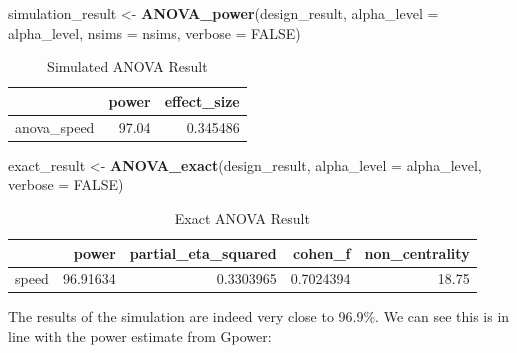 \documentclass[]{book}
\newenvironment{Shaded}{\begin{snugshade}}{\end{snugshade}}
\newcommand{\DataTypeTok}[1]{\textcolor[rgb]{0.13,0.29,0.53}{#1}}
\newcommand{\KeywordTok}[1]{\textcolor[rgb]{0.13,0.29,0.53}{\textbf{#1}}}
\newcommand{\NormalTok}[1]{#1}
\newcommand{\OtherTok}[1]{\textcolor[rgb]{0.56,0.35,0.01}{#1}}
\newcommand{\StringTok}[1]{\textcolor[rgb]{0.31,0.60,0.02}{#1}}
\begin{document}
\begin{Shaded}
\begin{Highlighting}[]
\NormalTok{simulation_result <-}\StringTok{ }\KeywordTok{ANOVA_power}\NormalTok{(design_result, }
                                 \DataTypeTok{alpha_level =}\NormalTok{ alpha_level, }
                                 \DataTypeTok{nsims =}\NormalTok{ nsims,}
                                 \DataTypeTok{verbose =} \OtherTok{FALSE}\NormalTok{)}
\end{Highlighting}
\end{Shaded}

\begin{table}[!h]

\caption{\label{tab:unnamed-chunk-111}Simulated ANOVA Result}
\centering
\begin{tabular}{l|r|r}
\hline
  & power & effect\_size\\
\hline
anova\_speed & 97.04 & 0.345486\\
\hline
\end{tabular}
\end{table}

\begin{Shaded}
\begin{Highlighting}[]
\NormalTok{exact_result <-}\StringTok{ }\KeywordTok{ANOVA_exact}\NormalTok{(design_result,}
                            \DataTypeTok{alpha_level =}\NormalTok{ alpha_level,}
                            \DataTypeTok{verbose =} \OtherTok{FALSE}\NormalTok{)}
\end{Highlighting}
\end{Shaded}

\begin{table}[!h]

\caption{\label{tab:unnamed-chunk-113}Exact ANOVA Result}
\centering
\begin{tabular}{l|r|r|r|r}
\hline
  & power & partial\_eta\_squared & cohen\_f & non\_centrality\\
\hline
speed & 96.91634 & 0.3303965 & 0.7024394 & 18.75\\
\hline
\end{tabular}
\end{table}

The results of the simulation are indeed very close to 96.9\%. We can see this is in line with the power estimate from Gpower:
\end{document}
